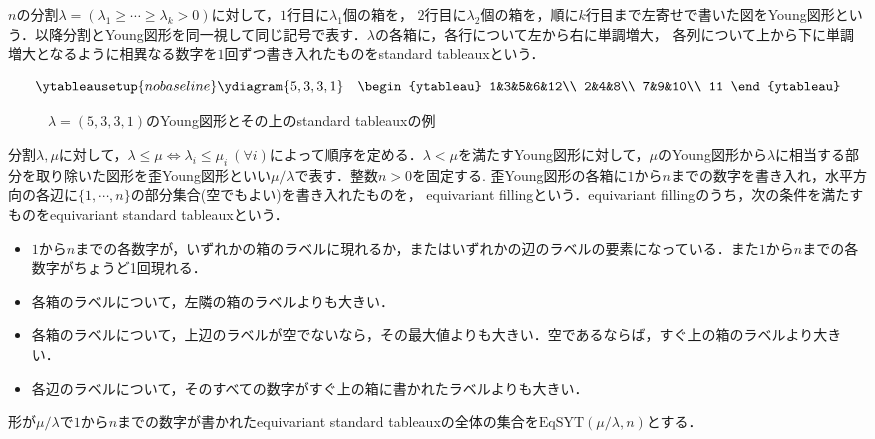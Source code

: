 \begin{defin}
  $n$の分割$\lambda=(\lambda_1\geq\cdots\geq\lambda_k>0)$に対して，$1$行目に$\lambda_1$個の箱を， $2$行目に$\lambda_2$個の箱を，順に$k$行目まで左寄せで書いた図をYoung図形という．以降分割とYoung図形を同一視して同じ記号で表す．$\lambda$の各箱に，各行について左から右に単調増大， 各列について上から下に単調増大となるように相異なる数字を$1$回ずつ書き入れたものをstandard tableauxという．
\end{defin}

\begin{eg}
\[
\ytableausetup{nobaseline}
\ydiagram{5, 3, 3, 1}
\quad\begin{ytableau}
    1&3&5&6&12\\
    2&4&8\\
    7&9&10\\
    11
\end{ytableau}
\]
\begin{figure}[htbp]
  \centering
  \caption{$\lambda=(5,3,3,1)$のYoung図形とその上のstandard tableauxの例}
\end{figure}
\end{eg}


\begin{defin}\label{label condition}
  分割$\lambda, \mu$に対して，$\lambda\leq\mu\Leftrightarrow \lambda_i\leq\mu_i\:(\forall i)$によって順序を定める．$\lambda<\mu$を満たすYoung図形に対して，$\mu$のYoung図形から$\lambda$に相当する部分を取り除いた図形を歪Young図形といい$\mu/\lambda$で表す．整数$n>0$を固定する. 歪Young図形の各箱に$1$から$n$までの数字を書き入れ，水平方向の各辺に$\{1,\cdots,n\}$の部分集合(空でもよい)を書き入れたものを， equivariant fillingという．equivariant fillingのうち，次の条件を満たすものをequivariant standard tableauxという．
  \begin{itemize}
    \item $1$から$n$までの各数字が，いずれかの箱のラベルに現れるか，またはいずれかの辺のラベルの要素になっている．また$1$から$n$までの各数字がちょうど1回現れる．
    \item 各箱のラベルについて，左隣の箱のラベルよりも大きい．
    \item 各箱のラベルについて，上辺のラベルが空でないなら，その最大値よりも大きい．空であるならば，すぐ上の箱のラベルより大きい．
    \item 各辺のラベルについて，そのすべての数字がすぐ上の箱に書かれたラベルよりも大きい．
  \end{itemize}
  形が$\mu/\lambda$で$1$から$n$までの数字が書かれたequivariant standard tableauxの全体の集合を$\text{EqSYT}(\mu/\lambda, n)$とする．
\end{defin}

